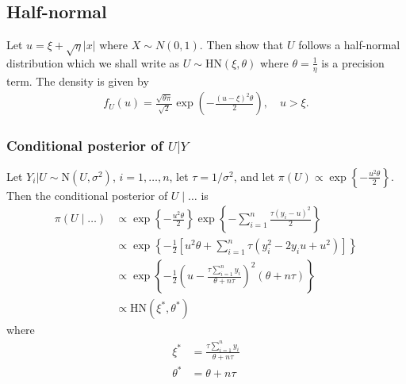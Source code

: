 
\subsection*{Half-normal}\label{s:hn}
Let $u = \xi + \sqrt{\eta} |x|$ where $X \sim N(0, 1)$.
Then \citet{Wiper2008} show that $U$ follows a half-normal distribution which we shall write as $U \sim \mbox{HN}(\xi, \theta )$ where $\theta = \displaystyle \frac{ 1 }{ \eta }$ is a precision term.
The density is given by 
\begin{align}
  f_U(u) = \frac{ \sqrt{\theta \pi} }{ \sqrt{2} } \exp \left( - \frac{ (u-\xi)^2 \theta }{ 2 } \right), \quad u > \xi.
\end{align}

\subsubsection*{Conditional posterior of $U | Y$}\label{s:condu}
Let $Y_i | U \sim \mbox{N}(U, \sigma^2)$, $i = 1, \ldots, n$, let $\tau = 1 / \sigma^2$, and let $\pi(U) \propto \exp \left\{ -\frac{ u^2 \theta }{ 2 } \right\}$. 
Then the conditional posterior of $U \mid \ldots$ is 
\begin{align}
  \pi (U \mid \ldots) & \propto \exp \left\{ -\frac{ u^2 \theta }{ 2 } \right\} \exp \left\{ - \sum_{i = 1 }^n\frac{ \tau (y_i - u)^2 }{ 2 } \right\} \nonumber \\
    & \propto \exp \left\{ -\frac{ 1 }{ 2 } \left[ u^2 \theta + \sum_{i=1 }^n\tau (y_i^2 - 2y_iu + u^2) \right] \right\} \nonumber \\
    & \propto \exp \left\{ - \frac{ 1 }{ 2 }\left( u - \frac{ \tau \sum_{i=1}^n y_i }{ \theta + n \tau } \right)^2 \left( \theta + n \tau \right) \right\} \nonumber\\
    & \propto \mbox{HN}(\xi^*, \theta^*) \label{eq:condu}
\end{align}
where 
\begin{align*}
  \xi^* &= \frac{ \tau \sum_{i=1}^n y_i }{ \theta + n \tau }\\
  \theta^* &= \theta + n \tau
\end{align*}


